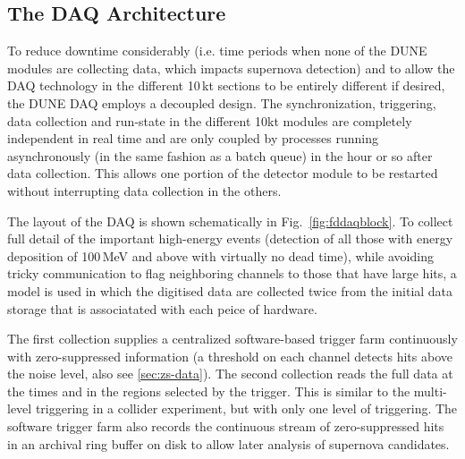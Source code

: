 \subsection{The DAQ Architecture}
\label{sec:daq-architecture}
To reduce downtime considerably (i.e. time periods when none of the DUNE modules are collecting data, which impacts supernova detection)
and to allow the DAQ technology in the different 10\,kt sections to be entirely different if desired, the DUNE DAQ employs a decoupled 
design. The synchronization, triggering, data collection and run-state in the different 10kt modules are completely independent in real time and
are only coupled by processes running asynchronously (in the same fashion as a batch queue) in the hour or so after data collection.
This allows one portion of the detector module to be restarted without interrupting
data collection in the others.

The layout of the DAQ is shown schematically in Fig.~\ref{fig:fddaqblock}.  To collect full detail of the
important high-energy events (detection of all those with energy deposition of 100\,MeV and above with virtually no dead time),
while avoiding tricky communication to flag neighboring channels to those that have large hits, a model is used
in which the digitised data are collected twice from the initial data
storage that is associatated with each peice of hardware. 


The first collection supplies a centralized software-based trigger farm continuously with
zero-suppressed information (a threshold on each channel detects hits above the noise level, also see \ref{sec:zs-data}).  
The second collection reads the full data at the times and in the regions %
selected by the trigger. This is similar to the multi-level triggering in a collider experiment,
but with only one level of triggering. The software trigger farm also
records the continuous stream of zero-suppressed hits in an archival
ring buffer on disk to allow later analysis of supernova candidates.

